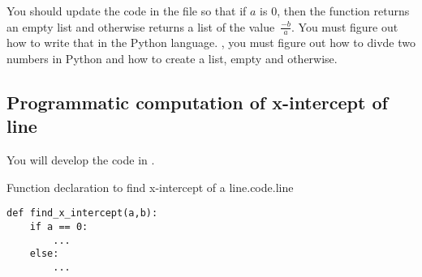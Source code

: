 You should update the code in the file  so that if
$a$ is 0, then the function returns an empty list and otherwise
returns a list of the value~$\frac{-b}{a}$.  You must figure out how
to write that in the Python language.  \Ie, you must figure out how to
divde two numbers in Python and how to create a list, empty and
otherwise.

\subsection{Programmatic computation of x-intercept of line}

You will develop the code in .

\begin{listing}{Function declaration to find x-intercept of a line.}{code.line}
\begin{minipage}[c]{0.95\textwidth}\begin{lstlisting}
def find_x_intercept(a,b):
    if a == 0:
        ... 
    else:
        ...
\end{lstlisting}\end{minipage}\end{listing}


